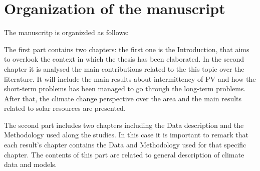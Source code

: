 


\section{Organization of the manuscript}%

The manuscritp is organizded as follows:

The first part contains two chapters: the first one is the Introduction, that aims to overlook the context in which the thesis has been elaborated. In the second chapter it is analysed the main contributions related to the this topic over the literature. It will include the main results about intermittency of PV and how the short-term problems has been managed to go through the long-term problems. After that, the climate change perspective over the area and the main results related to solar resources are presented.

The second part includes two chapters including the Data description and the Methodology used along the studies. In this case it is important to remark that each result's chapter contains the Data and Methodology used for that specific chapter. The contents of this part are related to general description of climate data and models.

